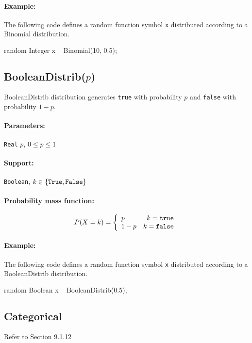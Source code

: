 \paragraph*{Example:}
The following code defines a random function symbol \verb|x| distributed according to a Binomial distribution.
\begin{blogcode}
random Integer x ~ Binomial(10, 0.5);
\end{blogcode}

\subsection{BooleanDistrib($p$)}
BooleanDistrib distribution generates \verb|true| with probability $p$ and \verb|false| with probability $1-p$. 

\paragraph*{Parameters:} 
\begin{itemize*}
\item[] \verb|Real|
 $p$, $0 \leq p \leq 1$ 
\end{itemize*}
\paragraph*{Support:} \verb|Boolean|, $k \in \{\verb|True|, \verb|False|\}$ 

\paragraph*{Probability mass function:}
\[
	P(X = k) = \left\{
	  \begin{array}{lr}
	    p & k = \verb|true| \\
	    1 - p & k = \verb|false|
	  \end{array}
	\right.
\]

\paragraph*{Example:}
The following code defines a random function symbol \verb|x| distributed according to a BooleanDistrib distribution.
\begin{blogcode}
random Boolean x ~ BooleanDistrib(0.5);
\end{blogcode}

\subsection{Categorical}
Refer to Section 9.1.12

